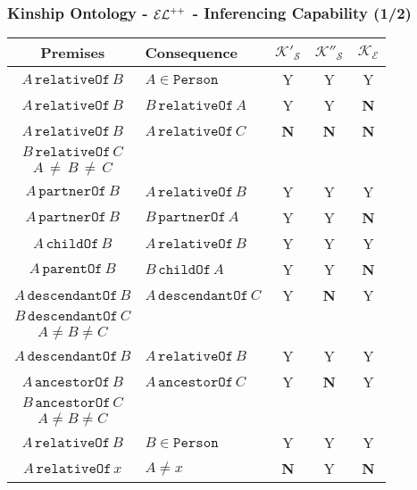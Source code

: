 \documentclass[8pt]{beamer}
\newcommand{\Persons}{\mathtt{Person}}
\newcommand{\relative}{\mathtt{relativeOf}}
\newcommand{\partner}{\mathtt{partnerOf}}
\newcommand{\child}{\mathtt{childOf}}
\newcommand{\parent}{\mathtt{parentOf}}
\newcommand{\ancestor}{\mathtt{ancestorOf}}
\newcommand{\descendant}{\mathtt{descendantOf}}
\newcommand{\Alice}{A}
\newcommand{\Bob}{B}
\newcommand{\Charlie}{C}
\newcommand{\KBtra}{\mathcal{K}'_{\mathcal{S}}}
\newcommand{\KBirr}{\mathcal{K}''_{\mathcal{S}}}
\newcommand{\KBel}{\mathcal{K_E}}
\newcommand{\testpassed}{\textsf{Y}}
\newcommand{\testfailed}{\bf{\textsf{N}}}
\begin{document}
\begin{frame}
\frametitle{Kinship Ontology - $\mathcal{EL}^{++}$ - Inferencing Capability (1/2)}

\begin{center}
\begin{small}
\begin{tabular}{|c|l|c|c|c|}
\hline
\bf{Premises} & \bf{Consequence} & $\KBtra$ & $\KBirr$ & $\KBel$\\
\hline
$\Alice\,\relative\,\Bob$ & $\Alice \in \Persons$ & \testpassed & \testpassed & \testpassed \\
\hline
$\Alice\,\relative\,\Bob$ & $\Bob\,\relative\,\Alice$ & \testpassed & \testpassed & \testfailed \\
\hline
$\Alice\,\relative\,\Bob$ & $\Alice\,\relative\,\Charlie$ & \testfailed & \testfailed & \testfailed \\
$\Bob\,\relative\,\Charlie$&&&&\\
$\Alice\,\neq\,\Bob\,\neq\,\Charlie$&&&&\\
\hline
$\Alice\,\partner\,\Bob$ & $\Alice\,\relative\,\Bob$ & \testpassed & \testpassed & \testpassed \\
\hline
$\Alice\,\partner\,\Bob$ & $\Bob\,\partner\,\Alice$ & \testpassed & \testpassed & \testfailed \\
\hline
$\Alice\,\child\,\Bob$ & $\Alice\,\relative\,\Bob$  & \testpassed & \testpassed & \testpassed \\
\hline
$\Alice\,\parent\,\Bob$ & $\Bob\,\child\,\Alice$ & \testpassed & \testpassed & \testfailed \\
\hline
$\Alice\,\descendant\,\Bob$ & $\Alice\,\descendant\,\Charlie$ & \testpassed & \testfailed & \testpassed \\
$\Bob\,\descendant\,\Charlie$ & & & &\\
$\Alice \neq \Bob \neq \Charlie$ & & & &\\
\hline
$\Alice\,\descendant\,\Bob$ & $\Alice\,\relative\,\Bob$ & \testpassed & \testpassed & \testpassed \\
\hline
$\Alice\,\ancestor\,\Bob$ & $\Alice\,\ancestor\,\Charlie$ & \testpassed & \testfailed & \testpassed \\
$\Bob\,\ancestor\,\Charlie$ & & & &\\
$\Alice\neq\Bob\neq\Charlie$& & & &\\
\hline
$\Alice\,\relative\,\Bob$ & $\Bob \in \Persons$ & \testpassed & \testpassed & \testpassed \\
\hline
$\Alice\,\relative\,x$ & $\Alice\neq x$ & \testfailed & \testpassed & \testfailed \\

\end{tabular}
\end{small}
\end{center}
\end{frame}
\end{document}
